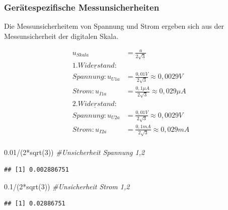 \documentclass[
  9pt,
]{article}
\newenvironment{Shaded}{\begin{snugshade}}{\end{snugshade}}
\newcommand{\CommentTok}[1]{\textcolor[rgb]{0.56,0.35,0.01}{\textit{#1}}}
\newcommand{\DecValTok}[1]{\textcolor[rgb]{0.00,0.00,0.81}{#1}}
\newcommand{\FloatTok}[1]{\textcolor[rgb]{0.00,0.00,0.81}{#1}}
\newcommand{\FunctionTok}[1]{\textcolor[rgb]{0.00,0.00,0.00}{#1}}
\newcommand{\NormalTok}[1]{#1}
\newcommand{\SpecialCharTok}[1]{\textcolor[rgb]{0.00,0.00,0.00}{#1}}
\begin{document}
\hypertarget{geruxe4tespezifische-messunsicherheiten}{%
\subsubsection{Gerätespezifische
Messunsicherheiten}\label{geruxe4tespezifische-messunsicherheiten}}

Die Messunsicherheitem von Spannung und Strom ergeben sich aus der
Messunsicherheit der digitalen Skala.

\begin{equation*}
\begin{split}
u_{Skala} &=\frac{a}{2\sqrt{3}} \\
\underline{1.Widerstand:} \\
Spannung: u_{U1a} &= \frac{0,01V}{2\sqrt{3}} \approx 0,0029 V \\
Strom: u_{I1a} &= \frac{0,1\mu A}{2\sqrt{3}} \approx 0,029\mu A \\
\underline{2.Widerstand:} \\
Spannung: u_{U2a} &= \frac{0,01V}{2\sqrt{3}} \approx 0,0029 V \\
Strom: u_{I2a} &= \frac{0,1mA}{2\sqrt{3}} \approx 0,029 mA \\
\end{split}
\end{equation*}

\begin{Shaded}
\begin{Highlighting}[]
\FloatTok{0.01}\SpecialCharTok{/}\NormalTok{(}\DecValTok{2}\SpecialCharTok{*}\FunctionTok{sqrt}\NormalTok{(}\DecValTok{3}\NormalTok{)) }\CommentTok{\#Unsicherheit Spannung 1,2}
\end{Highlighting}
\end{Shaded}

\begin{verbatim}
## [1] 0.002886751
\end{verbatim}

\begin{Shaded}
\begin{Highlighting}[]
\FloatTok{0.1}\SpecialCharTok{/}\NormalTok{(}\DecValTok{2}\SpecialCharTok{*}\FunctionTok{sqrt}\NormalTok{(}\DecValTok{3}\NormalTok{)) }\CommentTok{\#Unsicherheit Strom 1,2}
\end{Highlighting}
\end{Shaded}

\begin{verbatim}
## [1] 0.02886751
\end{verbatim}
\end{document}
